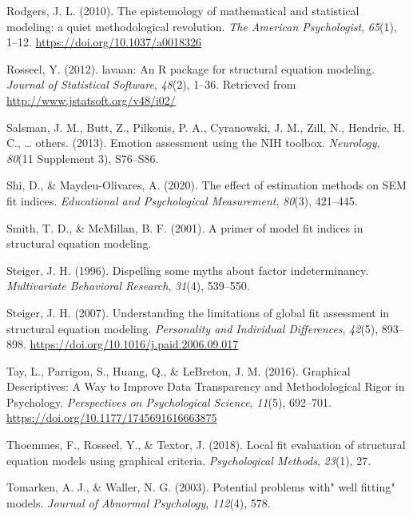\documentclass[
  english,
  man]{apa6}
\newlength{\cslhangindent}
\newenvironment{cslreferences}%
  {\setlength{\parindent}{0pt}%
  \everypar{\setlength{\hangindent}{\cslhangindent}}\ignorespaces}%
  {\par}
\begin{document}
\begin{cslreferences}
\leavevmode\hypertarget{ref-rodgers_epistemology_2010}{}%
Rodgers, J. L. (2010). The epistemology of mathematical and statistical modeling: a quiet methodological revolution. \emph{The American Psychologist}, \emph{65}(1), 1--12. \url{https://doi.org/10.1037/a0018326}

\leavevmode\hypertarget{ref-lavaan}{}%
Rosseel, Y. (2012). lavaan: An R package for structural equation modeling. \emph{Journal of Statistical Software}, \emph{48}(2), 1--36. Retrieved from \url{http://www.jstatsoft.org/v48/i02/}

\leavevmode\hypertarget{ref-salsman2013emotion}{}%
Salsman, J. M., Butt, Z., Pilkonis, P. A., Cyranowski, J. M., Zill, N., Hendrie, H. C., \ldots{} others. (2013). Emotion assessment using the NIH toolbox. \emph{Neurology}, \emph{80}(11 Supplement 3), S76--S86.

\leavevmode\hypertarget{ref-shi2020effect}{}%
Shi, D., \& Maydeu-Olivares, A. (2020). The effect of estimation methods on SEM fit indices. \emph{Educational and Psychological Measurement}, \emph{80}(3), 421--445.

\leavevmode\hypertarget{ref-smith2001primer}{}%
Smith, T. D., \& McMillan, B. F. (2001). A primer of model fit indices in structural equation modeling.

\leavevmode\hypertarget{ref-steiger1996dispelling}{}%
Steiger, J. H. (1996). Dispelling some myths about factor indeterminancy. \emph{Multivariate Behavioral Research}, \emph{31}(4), 539--550.

\leavevmode\hypertarget{ref-Steiger2007}{}%
Steiger, J. H. (2007). Understanding the limitations of global fit assessment in structural equation modeling. \emph{Personality and Individual Differences}, \emph{42}(5), 893--898. \url{https://doi.org/10.1016/j.paid.2006.09.017}

\leavevmode\hypertarget{ref-Tay2016a}{}%
Tay, L., Parrigon, S., Huang, Q., \& LeBreton, J. M. (2016). Graphical Descriptives: A Way to Improve Data Transparency and Methodological Rigor in Psychology. \emph{Perspectives on Psychological Science}, \emph{11}(5), 692--701. \url{https://doi.org/10.1177/1745691616663875}

\leavevmode\hypertarget{ref-thoemmes2018local}{}%
Thoemmes, F., Rosseel, Y., \& Textor, J. (2018). Local fit evaluation of structural equation models using graphical criteria. \emph{Psychological Methods}, \emph{23}(1), 27.

\leavevmode\hypertarget{ref-tomarken2003potential}{}%
Tomarken, A. J., \& Waller, N. G. (2003). Potential problems with" well fitting" models. \emph{Journal of Abnormal Psychology}, \emph{112}(4), 578.


\end{cslreferences}
\end{document}
